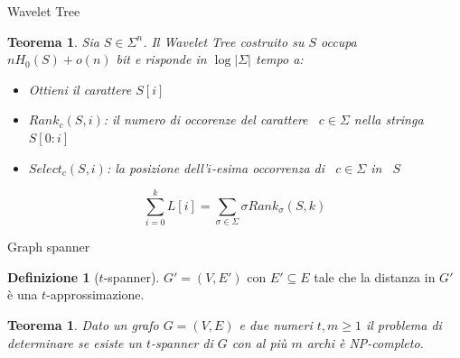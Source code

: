\documentclass{beamer}
\newcounter{counter1}
\theoremstyle{plain}
\newtheorem{myteo}[counter1]{Teorema}
\theoremstyle{definition}
\newtheorem{mydef}[counter1]{Definizione}
\theoremstyle{remark}
\newcommand{\abs}[1]{\left|#1\right|}
\begin{document}
\begin{frame}{Wavelet Tree}
  \label{frame:wavelettree}
  \begin{myteo}
    Sia $S \in\Sigma ^n$. Il Wavelet Tree costruito su $S$ occupa
    $nH_0(S) + o(n)$ bit e risponde in $\log \abs{\Sigma}$ tempo a:
    \begin{itemize}
    \item Ottieni il carattere $S[i]$
    \item $Rank_c (S,i)$: il numero di occorenze del carattere~ $c\in
      \Sigma$ nella stringa $S[0:i]$
    \item $Select _c (S,i)$: la posizione dell'$i$-esima occorrenza
      di~ $c\in \Sigma$ in~ $S$
    \end{itemize}
  \end{myteo}

  \[ \sum _{i=0} ^ {k} L[i] = \sum _{\sigma \in \Sigma} \sigma Rank
  _\sigma (S,k) \]
\end{frame}


\begin{frame}{Graph spanner}
    \begin{mydef}[$t$-spanner]
    $G' = (V,E')$ con $E' \subseteq E$ tale che la distanza in $G'$
    \`e una $t$-approssimazione.
  \end{mydef}

  \begin{myteo}
    Dato un grafo $G = (V,E)$ e due numeri $t,m\ge 1$ il problema di
    determinare se esiste un $t$-spanner di $G$ con al pi\`u $m$ archi
    \`e NP-completo.
  \end{myteo}
\end{frame}
\end{document}
